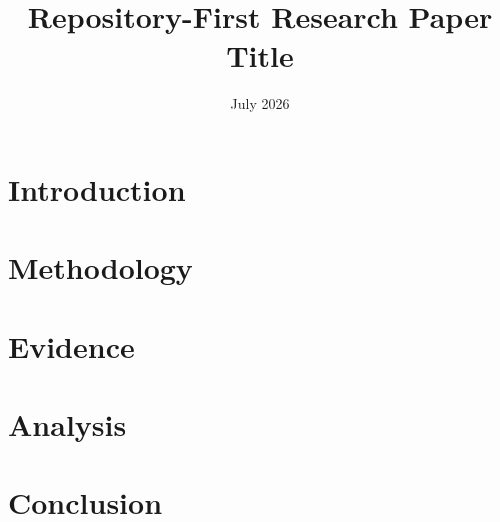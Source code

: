 \documentclass[11pt]{article}
\title{Repository-First Research Paper Title}
\author{}
\date{July 2026}
\begin{document}
\maketitle

\begin{abstract}

\end{abstract}

\section{Introduction}


\section{Methodology}


\section{Evidence}


\section{Analysis}


\section{Conclusion}




\end{document}
